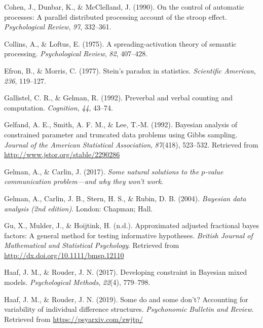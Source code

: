 \documentclass[english,,man]{apa6}
\begin{document}
\leavevmode\hypertarget{ref-Cohen:etal:1990}{}%
Cohen, J., Dunbar, K., \& McClelland, J. (1990). On the control of automatic processes: A parallel distributed processing account of the stroop effect. \emph{Psychological Review}, \emph{97}, 332--361.

\leavevmode\hypertarget{ref-Collins:Loftus:1975}{}%
Collins, A., \& Loftus, E. (1975). A spreading-activation theory of semantic processing. \emph{Psychological Review}, \emph{82}, 407--428.

\leavevmode\hypertarget{ref-Efron:Morris:1977}{}%
Efron, B., \& Morris, C. (1977). Stein's paradox in statistics. \emph{Scientific American}, \emph{236}, 119--127.

\leavevmode\hypertarget{ref-Gallistel:Gelman:1992}{}%
Gallistel, C. R., \& Gelman, R. (1992). Preverbal and verbal counting and computation. \emph{Cognition}, \emph{44}, 43--74.

\leavevmode\hypertarget{ref-Gelfand:etal:1992}{}%
Gelfand, A. E., Smith, A. F. M., \& Lee, T.-M. (1992). Bayesian analysis of constrained parameter and truncated data problems using Gibbs sampling. \emph{Journal of the American Statistical Association}, \emph{87}(418), 523--532. Retrieved from \url{http://www.jstor.org/stable/2290286}

\leavevmode\hypertarget{ref-Gelman:Carlin:2017}{}%
Gelman, A., \& Carlin, J. (2017). \emph{Some natural solutions to the \(p\)-value communication problem---and why they won't work}.

\leavevmode\hypertarget{ref-Gelman:etal:2004}{}%
Gelman, A., Carlin, J. B., Stern, H. S., \& Rubin, D. B. (2004). \emph{Bayesian data analysis (2nd edition)}. London: Chapman; Hall.

\leavevmode\hypertarget{ref-Gu:etal:inpress}{}%
Gu, X., Mulder, J., \& Hoijtink, H. (n.d.). Approximated adjusted fractional bayes factors: A general method for testing informative hypotheses. \emph{British Journal of Mathematical and Statistical Psychology}. Retrieved from \url{http://dx.doi.org/10.1111/bmsp.12110}

\leavevmode\hypertarget{ref-Haaf:Rouder:2017}{}%
Haaf, J. M., \& Rouder, J. N. (2017). Developing constraint in Bayesian mixed models. \emph{Psychological Methods}, \emph{22}(4), 779--798.

\leavevmode\hypertarget{ref-Haaf:Rouder:2019}{}%
Haaf, J. M., \& Rouder, J. N. (2019). Some do and some don't? Accounting for variability of individual difference structures. \emph{Psychonomic Bulletin and Review}. Retrieved from \url{https://psyarxiv.com/zwjtp/}
\end{document}
